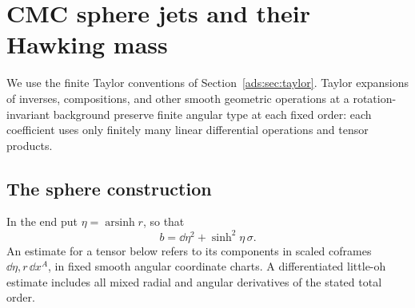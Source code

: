 \section{CMC sphere jets and their Hawking mass}
\label{ads:sec:cmc}

We use the finite Taylor conventions of Section~\ref{ads:sec:taylor}.
Taylor expansions of inverses, compositions, and other smooth geometric
operations at a rotation-invariant background preserve finite angular
type at each fixed order: each coefficient uses only finitely many
linear differential operations and tensor products.

\subsection{The sphere construction}

In the end put \(\eta=\operatorname{arsinh}r\), so that
\[
 b=\dd\eta^2+\sinh^2\eta\,\sigma.
\]
An estimate for a tensor below refers to its components in scaled
coframes \(\dd\eta,r\,\dd x^A\), in fixed smooth angular coordinate
charts.  A differentiated little-oh estimate includes all mixed
radial and angular derivatives of the stated total order.

